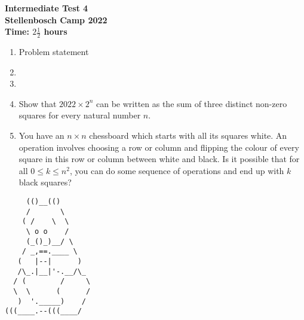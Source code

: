 \documentclass{article}
\begin{document}
\thispagestyle{empty}

\begin{center}
  \textbf{\Large Intermediate Test 4}
  \\ \vspace{1em}
  \textbf{\large Stellenbosch Camp 2022}
  \\ \vspace{1em}
  \textbf{\large Time: $2\frac{1}{2}$ hours}
\end{center}

\bigskip

\begin{enumerate}[itemsep=\fill]

\item %
Problem statement


\item %


\item 

\item %
Show that $2022 \times 2^n$ can be written as the sum of three distinct non-zero squares for every natural number $n$.


\item %
You have an $n \times n$ chessboard which starts with all its squares white.
An operation involves choosing a row or column and flipping the colour of every square in this row or column between white and black.
Is it possible that for all $0 \leq k \leq n^2$, you can do some sequence of operations and end up with $k$ black squares?

\end{enumerate}


\vfill
\centering
\small
\begin{BVerbatim}
     (()__(()
     /       \ 
    ( /    \  \
     \ o o    /
     (_()_)__/ \             
    / _,==.____ \
   (   |--|      )
   /\_.|__|'-.__/\_
  / (        /     \ 
  \  \      (      /
   )  '._____)    /    
(((____.--(((____/
\end{BVerbatim}
\end{document}

